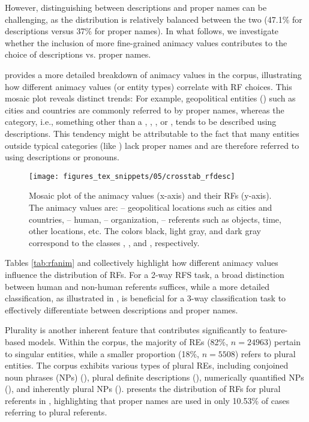 

However, distinguishing between descriptions and proper names can be challenging, as the distribution is relatively balanced between the two (47.1\% for descriptions versus 37\% for proper names). In what follows, we investigate whether the inclusion of more fine-grained animacy values contributes to the choice of descriptions vs. proper names.

 provides a more detailed breakdown of animacy values in the \wsj corpus, illustrating how different animacy values (or entity types) correlate with RF choices. This mosaic plot reveals distinct trends: For example, geopolitical entities () such as cities and countries are commonly referred to by proper names, whereas the  category, i.e., something other than a , , , or , tends to be described using descriptions. This tendency might be attributable to the fact that many entities outside typical categories (like ) lack proper names and are therefore referred to using descriptions or pronouns.

\begin{figure}
\texttt{[image: figures\_tex\_snippets/05/crosstab\_rfdesc]}
\caption[Mosaic plot of the animacy values of the REs (x-axis) and
their RFs (y-axis).]{Mosaic plot of the animacy values (x-axis) and their RFs (y-axis). The animacy values are:  -- geopolitical locations such as cities and countries,  -- human,  -- organization,  -- referents such as objects, time, other locations, etc. The colors black, light gray, and dark gray correspond to the classes , , and , respectively.} 

\label{fig:crosstabrfdesc}
\end{figure}


Tables \ref{tab:rfanim} and  collectively highlight how different animacy values influence the distribution of RFs. For a 2-way RFS task, a broad distinction between human and non-human referents suffices, while a more detailed classification, as illustrated in , is beneficial for a 3-way classification task to effectively differentiate between descriptions and proper names.

Plurality is another inherent feature that contributes significantly to feature-based \context models. Within the \wsj corpus, the majority of REs (82\%, $n=24963$) pertain to singular entities, while a smaller proportion (18\%, $n=5508$) refers to plural entities. The corpus exhibits various types of plural REs, including conjoined noun phrases (NPs) (), plural definite descriptions (), numerically quantified NPs (), and inherently plural NPs ().  presents the distribution of RFs for plural referents in \wsj, highlighting that proper names are used in only 10.53\% of cases referring to plural referents.

